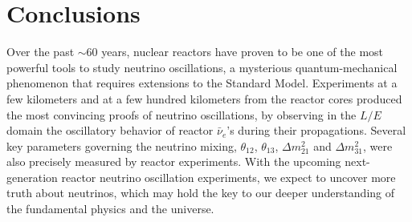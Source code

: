 \section{Conclusions} 
\label{sec:conclusions}

Over the past $\sim$60 years, nuclear reactors have proven to be one of the most powerful tools to study neutrino oscillations, a mysterious quantum-mechanical phenomenon that requires extensions to the Standard Model. Experiments at a few kilometers and at a few hundred kilometers from the reactor cores produced the most convincing proofs of neutrino oscillations, by observing in the $L/E$ domain the oscillatory behavior of reactor $\bar\nu_e$'s during their propagations. Several key parameters governing the neutrino mixing, $\theta_{12}$, $\theta_{13}$, $\Delta{m}^2_{21}$ and $\Delta{m}^2_{31}$, were also precisely measured by reactor experiments. With the upcoming next-generation reactor neutrino oscillation experiments, we expect to uncover more truth about neutrinos, which may hold the key to our deeper understanding of the fundamental physics and the universe.

